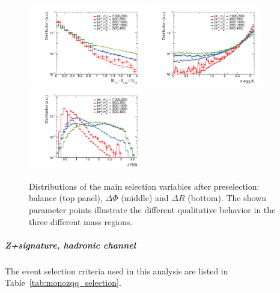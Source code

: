 \begin{figure}
\centering
\includegraphics[width=0.45\textwidth]{texinputs/04_grid/figures/monoz/leptonic/presel_h_balance.pdf}
\includegraphics[width=0.45\textwidth]{texinputs/04_grid/figures/monoz/leptonic/presel_h_dphi_met_ll.pdf}
\includegraphics[width=0.45\textwidth]{texinputs/04_grid/figures/monoz/leptonic/presel_h_dr_ll.pdf}
\caption{Distributions of the main selection variables after preselection: \pt balance (top panel), $\Delta\Phi$ (middle) and $\Delta R$ (bottom). The shown parameter points illustrate the different qualitative behavior in the three different mass regions. }
\label{fig:monoz_kin_presel}
\end{figure}

\subparagraph{Z+\MET signature, hadronic channel}

The event selection criteria used in this analysis are listed in Table~\ref{tab:monozqq_selection}.

